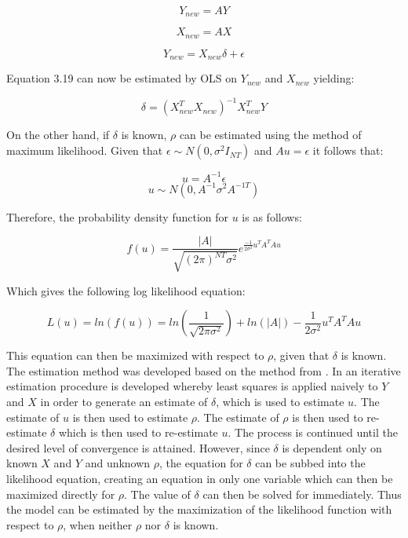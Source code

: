 \begin{equation}
    Y_{new}=AY
\end{equation}

\begin{equation}
    X_{new}=AX
\end{equation}

\begin{equation}
    Y_{new}= X_{new}\delta+\epsilon
\end{equation}

Equation 3.19 can now be estimated by OLS on $Y_{new}$ and $X_{new}$ yielding:

\begin{equation}
  \delta=(X_{new}^TX_{new})^{-1}X_{new}^TY
\end{equation}

On the other hand, if $\delta$ is known, $\rho$ can be estimated using the method of maximum likelihood. Given that $\epsilon\sim N(0,\sigma^2I_{NT})$ and $Au=\epsilon$ it follows that:

\begin{equation}
    u=A^{-1}\epsilon
\end{equation}
\begin{equation}
    u\sim N(0,A^{-1}\sigma^2A^{-1T})
\end{equation}

Therefore, the probability density function for $u$ is as follows:

\begin{equation}
    f(u)=\frac{|A|}{\sqrt{(2\pi)^{NT}\sigma^2}}e^{\frac{-1}{2\sigma^2}u^TA^TAu}
\end{equation}

Which gives the following log likelihood equation:

\begin{equation}
  L(u)=ln(f(u))=ln(\frac{1}{\sqrt{2\pi\sigma^2}})+ln(|A|)-\frac{1}{2\sigma^2}u^TA^TAu
\end{equation}

This equation can then be maximized with respect to $\rho$, given that $\delta$ is known. The estimation method was developed based on the method from \cite{cochrane1949application}. In \cite{cochrane1949application} an iterative estimation procedure is developed whereby least squares is applied naively to $Y$ and $X$ in order to generate an estimate of $\delta$, which is used to estimate $u$. The estimate of $u$ is then used to estimate $\rho$. The estimate of $\rho$ is then used to re-estimate $\delta$ which is then used to re-estimate $u$. The process is continued until the desired level of convergence is attained. However, since $\delta$ is dependent only on known $X$ and $Y$ and unknown $\rho$, the equation for $\delta$ can be subbed into the likelihood equation, creating an equation in only one variable which can then be maximized directly for $\rho$. The value of $\delta$ can then be solved for  immediately. Thus the model can be estimated by the maximization of the likelihood function with respect to $\rho$, when neither $\rho$ nor $\delta$ is known. 


